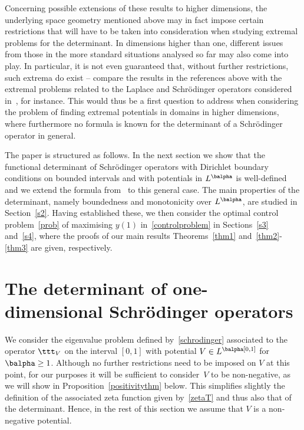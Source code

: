 Concerning possible extensions of these results to higher dimensions, the underlying space geometry mentioned above may in fact impose certain
restrictions that will have to be taken into consideration when studying extremal problems for the determinant. In dimensions
higher than one, different issues from those in the more standard situations analysed so far may also come into play. In particular, it is not
even guaranteed that, without further restrictions, such extrema do exist -- compare the results in the references above with the extremal problems
related to the Laplace and Schrödinger operators considered in~\cite{BGRV,harr,henr}, for instance. This would thus be a first question to
address when considering the problem of finding extremal potentials in domains in higher dimensions, where furthermore no formula is known
for the determinant of a Schrödinger operator in general.

The paper is structured as follows. In the next section we show that the functional determinant of Schrödinger
operators with Dirichlet boundary conditions on bounded intervals and with potentials in $L^\balpha$ is well-defined and we extend the formula
from~\cite{Levit-Smilansky} to this general case. The main properties of the determinant, namely boundedness and monotonicity over
$L^\balpha$, are studied in Section~\ref{s2}. Having established these, we then consider the optimal control problem~\eqref{prob} of
maximising $y(1)$ in~\eqref{controlproblem} in Sections~\ref{s3} and~\ref{s4}, where the proofs of our main results Theorems~\ref{thm1}
and~\ref{thm2}-\ref{thm3} are given, respectively.

\section{The determinant of one-dimensional Schrödinger operators}\label{s1}
We consider the eigenvalue problem defined by~\eqref{schrodinger} associated to
the operator $\ttt_V$ on the interval $[0,1]$ with potential $V\in L^\balpha[0,1]$ for $\balpha\geq 1$. Although no further
restrictions need to be imposed on $V$ at this point, for our purposes it will be sufficient to consider~$V$ to be non-negative,
as we will show in Proposition~\ref{positivitythm} below. This simplifies slightly the definition of the associated zeta function given by~\eqref{zetaT}
and thus also that of the determinant. Hence, in the rest of this section we assume that $V$ is a non-negative potential.

